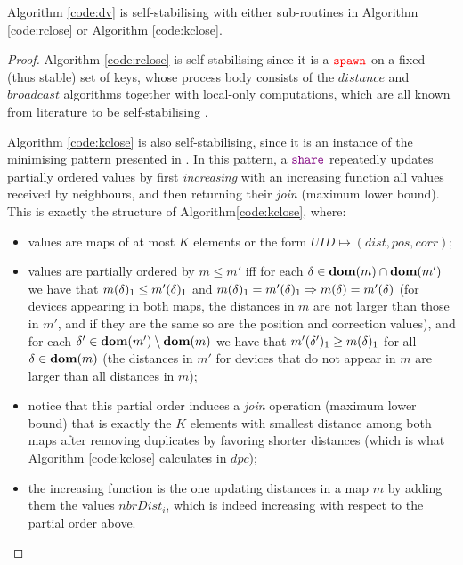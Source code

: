 \documentclass[runningheads]{llncs}
\begin{document}
\begin{theorem}
    Algorithm \ref{code:dv} is self-stabilising with either sub-routines in Algorithm \ref{code:rclose} or Algorithm \ref{code:kclose}.
\end{theorem}
\begin{proof}
    Algorithm \ref{code:rclose} is self-stabilising since it is a ${{\color{red}\mathtt{spawn}}}$ on a fixed (thus stable) set of keys, whose process body consists of the $\mathit{distance}$ and $\mathit{broadcast}$ algorithms together with local-only computations, which are all known from literature to be self-stabilising \cite{Viroli:TOMACS_selfstabilisation}.

    Algorithm \ref{code:kclose} is also self-stabilising, since it is an instance of the minimising pattern presented in \cite{Viroli:TOMACS_selfstabilisation}. In this pattern, a ${{\color{violet}\mathtt{share}}}$ repeatedly updates partially ordered values by first \emph{increasing} with an increasing function all values received by neighbours, and then returning their \emph{join} (maximum lower bound). This is exactly the structure of Algorithm\ref{code:kclose}, where:
    \begin{itemize}
        \item values are maps of at most $K$ elements or the form $\mathit{UID} \mapsto (\mathit{dist}, \mathit{pos}, \mathit{corr})$;
        \item values are partially ordered by $m \leq m'$ iff for each $\delta \in \textbf{dom}(m) \cap \textbf{dom}(m')$ we have that $m(\delta)_1 \le m'(\delta)_1$ and $m(\delta)_1 = m'(\delta)_1 \Rightarrow m(\delta) = m'(\delta)$ (for devices appearing in both maps, the distances in $m$ are not larger than those in $m'$, and if they are the same so are the position and correction values), and for each $\delta' \in \textbf{dom}(m') \setminus \textbf{dom}(m)$ we have that $m'(\delta')_1 \geq m(\delta)_1$ for all $\delta \in \textbf{dom}(m)$ (the distances in $m'$ for devices that do not appear in $m$ are larger than all distances in $m$);
        \item notice that this partial order induces a \emph{join} operation (maximum lower bound) that is exactly the $K$ elements with smallest distance among both maps after removing duplicates by favoring shorter distances (which is what Algorithm \ref{code:kclose} calculates in $\mathit{dpc}$);
        \item the increasing function is the one updating distances in a map $m$ by adding them the values $\mathit{nbrDist}_i$, which is indeed increasing with respect to the partial order above.
    \end{itemize}


\end{proof}
\end{document}

